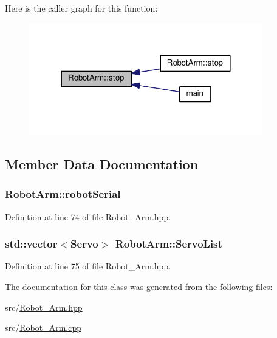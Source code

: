 Here is the caller graph for this function\+:\nopagebreak
\begin{figure}[H]
\begin{center}
\leavevmode
\includegraphics[width=288pt]{class_robot_arm_abd7be4339ad5fe6c65b07b4930f52e69_icgraph}
\end{center}
\end{figure}




\subsection{Member Data Documentation}
\subsubsection[{\texorpdfstring{robot\+Serial}{robotSerial}}]{ Robot\+Arm\+::robot\+Serial\hspace{0.3cm}{\ttfamily [private]}}\hypertarget{class_robot_arm_aa1be826408c3c876e2227095bba1cd17}{}\label{class_robot_arm_aa1be826408c3c876e2227095bba1cd17}


Definition at line 74 of file Robot\+\_\+\+Arm.\+hpp.

\subsubsection[{\texorpdfstring{Servo\+List}{ServoList}}]{\setlength{\rightskip}{0pt plus 5cm}std\+::vector$<${\bf Servo}$>$ Robot\+Arm\+::\+Servo\+List\hspace{0.3cm}{\ttfamily [private]}}\hypertarget{class_robot_arm_a2fd2d1c096f1b147b7882d7bfd202eaf}{}\label{class_robot_arm_a2fd2d1c096f1b147b7882d7bfd202eaf}


Definition at line 75 of file Robot\+\_\+\+Arm.\+hpp.



The documentation for this class was generated from the following files\+:\begin{DoxyCompactItemize}
\item 
src/\hyperlink{_robot___arm_8hpp}{Robot\+\_\+\+Arm.\+hpp}\item 
src/\hyperlink{_robot___arm_8cpp}{Robot\+\_\+\+Arm.\+cpp}\end{DoxyCompactItemize}
